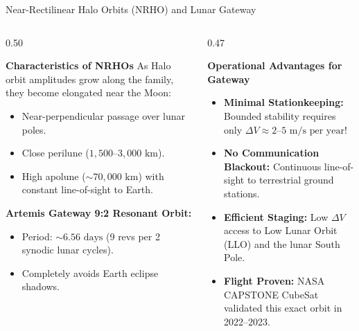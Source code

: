 \documentclass[aspectratio=169, 10pt]{beamer}
\begin{document}
\begin{frame}{Near-Rectilinear Halo Orbits (NRHO) and Lunar Gateway}
    \begin{columns}[t]
        \begin{column}{0.50\textwidth}
            \begin{block}{\textbf{Characteristics of NRHOs}}
                \scriptsize
                As Halo orbit amplitudes grow along the family, they become elongated near the Moon:
                \begin{itemize}\setlength{\itemsep}{1.5pt}
                    \item Near-perpendicular passage over lunar poles.
                    \item Close perilune ($1,500\text{--}3,000\text{ km}$).
                    \item High apolune ($\sim 70,000\text{ km}$) with constant line-of-sight to Earth.
                \end{itemize}
                \par\vspace{2pt}
                \textbf{Artemis Gateway 9:2 Resonant Orbit:}
                \begin{itemize}\setlength{\itemsep}{1.5pt}
                    \item Period: $\sim 6.56\text{ days}$ (9 revs per 2 synodic lunar cycles).
                    \item Completely avoids Earth eclipse shadows.
                \end{itemize}
            \end{block}
        \end{column}
        
        \begin{column}{0.47\textwidth}
            \begin{block}{\textbf{Operational Advantages for Gateway}}
                \scriptsize
                \begin{itemize}\setlength{\itemsep}{2.5pt}
                    \item \textbf{Minimal Stationkeeping:} Bounded stability requires only $\Delta V \approx 2\text{--}5\text{ m/s per year}$!
                    \item \textbf{No Communication Blackout:} Continuous line-of-sight to terrestrial ground stations.
                    \item \textbf{Efficient Staging:} Low $\Delta V$ access to Low Lunar Orbit (LLO) and the lunar South Pole.
                    \item \textbf{Flight Proven:} NASA CAPSTONE CubeSat validated this exact orbit in 2022--2023.
                \end{itemize}
            \end{block}
        \end{column}
    \end{columns}
\end{frame}
\end{document}
